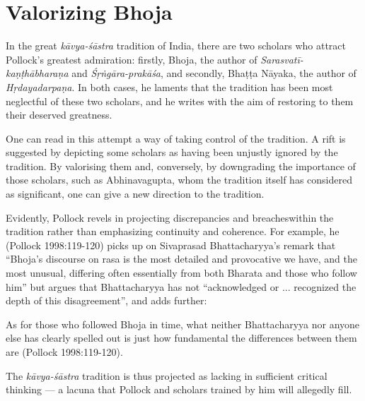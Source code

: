 \section*{Valorizing Bhoja}

In the great \textsl{kāvya-śāstra} tradition of India, there are two scholars who attract Pollock's greatest admiration: firstly, Bhoja, the author of \textsl{Sarasvatī-kaṇṭhābharaṇa} and \textsl{Śṛṅgāra-prakāśa}, and secondly, Bhaṭṭa Nāyaka, the author of \textsl{Hṛdayadarpaṇa}. In both cases, he laments that the tradition has been most neglectful of these two scholars, and he writes with the aim of restoring to them their deserved greatness. 

One can read in this attempt a way of taking control of the tradition. A rift is suggested by depicting some scholars as having been unjustly ignored by the tradition. By valorising them and, conversely, by downgrading the importance of those scholars, such as Abhinavagupta, whom the tradition itself has considered as significant, one can give a new direction to the tradition.

Evidently, Pollock revels in projecting discrepancies and breaches\break within the tradition rather than emphasizing continuity and coherence. For example, he (Pollock 1998:119-120) picks up on Sivaprasad Bhattacharyya's remark that ``Bhoja's discourse on rasa is the most detailed and provocative we have, and the most unusual, differing often essentially from both Bharata and those who follow him'' but argues that Bhattacharyya has not ``acknowledged or ... recognized the depth of this disagreement'', and adds further:

\begin{myquote}
As for those who followed Bhoja in time, what neither Bhattacharyya nor anyone else has clearly spelled out is just how fundamental the differences between them are 
\hfill (Pollock 1998:119-120).  
\end{myquote}

The \textsl{kāvya-śāstra} tradition is thus projected as lacking in sufficient critical thinking --- a lacuna that Pollock and scholars trained by him will allegedly fill.
\newpage

